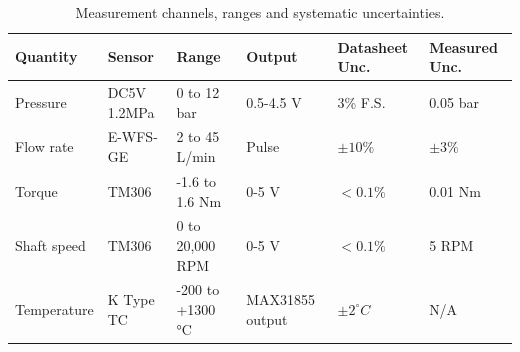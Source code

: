 \begin{table}[H]
    \centering
    \caption{Measurement channels, ranges and systematic uncertainties. %
    }
    \label{tab:instruments}
    \begin{tabular}{llllll}
        \toprule
        Quantity & Sensor & Range & Output & Datasheet Unc. & Measured Unc.\\
        \midrule
        Pressure & DC5V 1.2MPa & 0 to 12 bar & 0.5-4.5 V & 3\% F.S. & 0.05 bar \\
        Flow rate & E-WFS-GE  & 2 to 45 L/min & Pulse & $\pm 10\%$ & $\pm 3\%$ \\
        Torque & TM306 & -1.6 to 1.6 Nm & 0-5 V & $<0.1\%$ & 0.01 Nm \\
        Shaft speed & TM306 & 0 to 20,000 RPM & 0-5 V & $<0.1\%$ & 5 RPM \\
        Temperature & K Type TC & -200 to +1300 °C & MAX31855 output & $\pm 2^{\circ}C$ & N/A \\
        \bottomrule
    \end{tabular}
\end{table}




